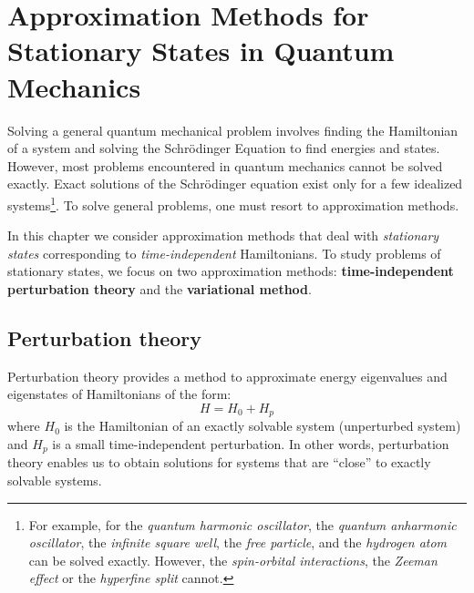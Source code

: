 \section{Approximation Methods for Stationary States in Quantum Mechanics}

Solving a general quantum mechanical problem involves finding the Hamiltonian of a system and solving the Schrödinger Equation to find energies and states. However, most problems encountered in quantum mechanics cannot be solved exactly. Exact solutions of the Schrödinger equation exist only for a few idealized systems\footnote{For example, for the \textit{quantum harmonic oscillator}, the \textit{quantum anharmonic oscillator}, the \textit{infinite square well}, the \textit{free particle}, and the \textit{hydrogen atom} can be solved exactly. However, the \textit{spin-orbital interactions}, the \textit{Zeeman effect} or the \textit{hyperfine split} cannot.}. To solve general problems, one must resort to approximation methods.

In this chapter we consider approximation methods that deal with \textit{stationary states} corresponding to \textit{time-independent} Hamiltonians. To study problems of stationary states, we focus on two approximation methods: \textbf{time-independent perturbation theory} and the \textbf{variational method}.

\subsection{Perturbation theory}

Perturbation theory provides a method to approximate energy eigenvalues and eigenstates of Hamiltonians of the form:
\begin{equation}
    H = H_0 + H_p
\end{equation}
where $H_0$ is the Hamiltonian of an exactly solvable system (unperturbed system) and $H_p$ is a small time-independent perturbation. In other words, perturbation theory enables us to obtain solutions for systems that are ``close'' to exactly solvable systems.

